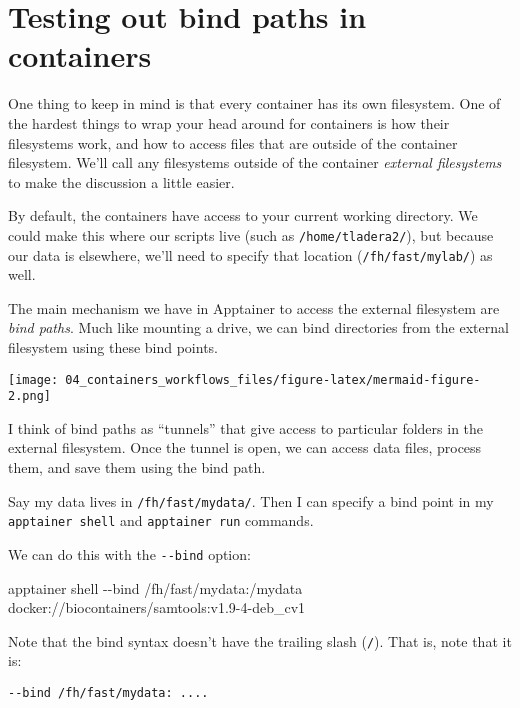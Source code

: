 \documentclass[
  letterpaper,
  DIV=11,
  numbers=noendperiod]{scrreprt}
\newenvironment{Shaded}{\begin{snugshade}}{\end{snugshade}}
\newcommand{\AttributeTok}[1]{\textcolor[rgb]{0.40,0.45,0.13}{#1}}
\newcommand{\ExtensionTok}[1]{\textcolor[rgb]{0.00,0.23,0.31}{#1}}
\newcommand{\NormalTok}[1]{\textcolor[rgb]{0.00,0.23,0.31}{#1}}
\begin{document}
\section{Testing out bind paths in containers}\label{sec-bindpaths}

One thing to keep in mind is that every container has its own
filesystem. One of the hardest things to wrap your head around for
containers is how their filesystems work, and how to access files that
are outside of the container filesystem. We'll call any filesystems
outside of the container \emph{external filesystems} to make the
discussion a little easier.

By default, the containers have access to your current working
directory. We could make this where our scripts live (such as
\texttt{/home/tladera2/}), but because our data is elsewhere, we'll need
to specify that location (\texttt{/fh/fast/mylab/}) as well.

The main mechanism we have in Apptainer to access the external
filesystem are \emph{bind paths}. Much like mounting a drive, we can
bind directories from the external filesystem using these bind points.

\texttt{[image: 04\_containers\_workflows\_files/figure-latex/mermaid-figure-2.png]}

I think of bind paths as ``tunnels'' that give access to particular
folders in the external filesystem. Once the tunnel is open, we can
access data files, process them, and save them using the bind path.

Say my data lives in \texttt{/fh/fast/mydata/}. Then I can specify a
bind point in my \texttt{apptainer\ shell} and \texttt{apptainer\ run}
commands.

We can do this with the \texttt{-\/-bind} option:

\begin{Shaded}
\begin{Highlighting}[]
\ExtensionTok{apptainer}\NormalTok{ shell }\AttributeTok{{-}{-}bind}\NormalTok{ /fh/fast/mydata:/mydata docker://biocontainers/samtools:v1.9{-}4{-}deb\_cv1}
\end{Highlighting}
\end{Shaded}

Note that the bind syntax doesn't have the trailing slash (\texttt{/}).
That is, note that it is:

\begin{verbatim}
--bind /fh/fast/mydata: ....
\end{verbatim}
\end{document}
